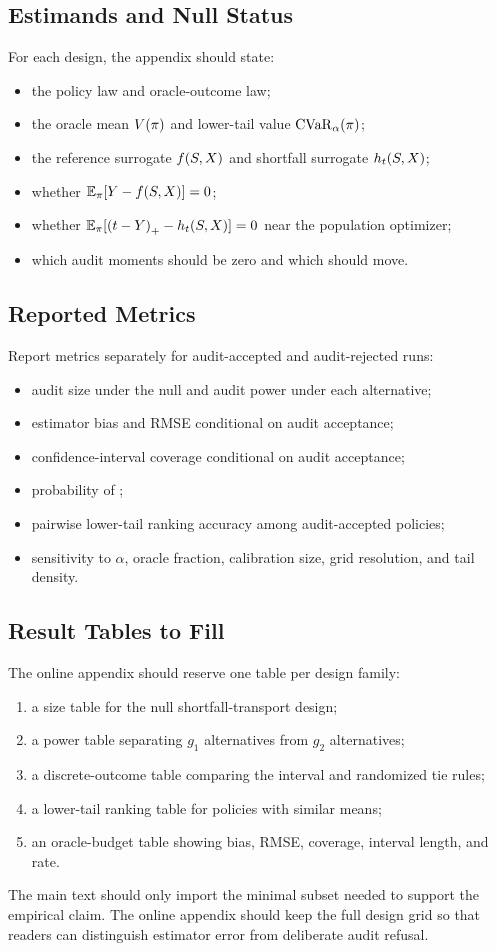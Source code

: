 \subsection{Estimands and Null Status}

For each design, the appendix should state:
\begin{itemize}[leftmargin=*,nosep]
\item the policy law and oracle-outcome law;
\item the oracle mean $V(\pi)$ and lower-tail value
$\mathrm{CVaR}_\alpha(\pi)$;
\item the reference surrogate $f(S,X)$ and shortfall surrogate
$h_t(S,X)$;
\item whether $\mathbb{E}_\pi[Y-f(S,X)]=0$;
\item whether $\mathbb{E}_\pi[\left(t-Y\right)_{+}-h_t(S,X)]=0$ near the
population optimizer;
\item which audit moments should be zero and which should move.
\end{itemize}

\subsection{Reported Metrics}

Report metrics separately for audit-accepted and audit-rejected runs:
\begin{itemize}[leftmargin=*,nosep]
\item audit size under the null and audit power under each alternative;
\item estimator bias and RMSE conditional on audit acceptance;
\item confidence-interval coverage conditional on audit acceptance;
\item probability of \RefuseLevel{};
\item pairwise lower-tail ranking accuracy among audit-accepted policies;
\item sensitivity to $\alpha$, oracle fraction, calibration size, grid
resolution, and tail density.
\end{itemize}

\subsection{Result Tables to Fill}

The online appendix should reserve one table per design family:
\begin{enumerate}[leftmargin=*,nosep]
\item a size table for the null shortfall-transport design;
\item a power table separating $g_1$ alternatives from $g_2$ alternatives;
\item a discrete-outcome table comparing the interval and randomized tie rules;
\item a lower-tail ranking table for policies with similar means;
\item an oracle-budget table showing bias, RMSE, coverage, interval length, and
\RefuseLevel{} rate.
\end{enumerate}

The main text should only import the minimal subset needed to support the
empirical claim. The online appendix should keep the full design grid so that
readers can distinguish estimator error from deliberate audit refusal.

